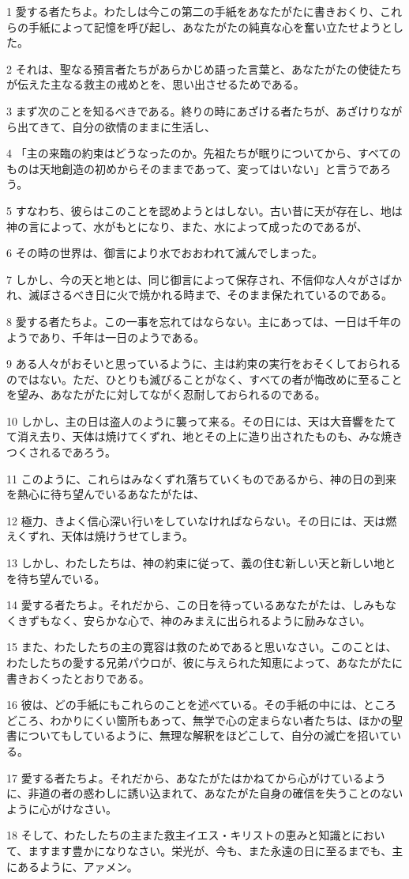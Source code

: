 \par 1 愛する者たちよ。わたしは今この第二の手紙をあなたがたに書きおくり、これらの手紙によって記憶を呼び起し、あなたがたの純真な心を奮い立たせようとした。
\par 2 それは、聖なる預言者たちがあらかじめ語った言葉と、あなたがたの使徒たちが伝えた主なる救主の戒めとを、思い出させるためである。
\par 3 まず次のことを知るべきである。終りの時にあざける者たちが、あざけりながら出てきて、自分の欲情のままに生活し、
\par 4 「主の来臨の約束はどうなったのか。先祖たちが眠りについてから、すべてのものは天地創造の初めからそのままであって、変ってはいない」と言うであろう。
\par 5 すなわち、彼らはこのことを認めようとはしない。古い昔に天が存在し、地は神の言によって、水がもとになり、また、水によって成ったのであるが、
\par 6 その時の世界は、御言により水でおおわれて滅んでしまった。
\par 7 しかし、今の天と地とは、同じ御言によって保存され、不信仰な人々がさばかれ、滅ぼさるべき日に火で焼かれる時まで、そのまま保たれているのである。
\par 8 愛する者たちよ。この一事を忘れてはならない。主にあっては、一日は千年のようであり、千年は一日のようである。
\par 9 ある人々がおそいと思っているように、主は約束の実行をおそくしておられるのではない。ただ、ひとりも滅びることがなく、すべての者が悔改めに至ることを望み、あなたがたに対してながく忍耐しておられるのである。
\par 10 しかし、主の日は盗人のように襲って来る。その日には、天は大音響をたてて消え去り、天体は焼けてくずれ、地とその上に造り出されたものも、みな焼きつくされるであろう。
\par 11 このように、これらはみなくずれ落ちていくものであるから、神の日の到来を熱心に待ち望んでいるあなたがたは、
\par 12 極力、きよく信心深い行いをしていなければならない。その日には、天は燃えくずれ、天体は焼けうせてしまう。
\par 13 しかし、わたしたちは、神の約束に従って、義の住む新しい天と新しい地とを待ち望んでいる。
\par 14 愛する者たちよ。それだから、この日を待っているあなたがたは、しみもなくきずもなく、安らかな心で、神のみまえに出られるように励みなさい。
\par 15 また、わたしたちの主の寛容は救のためであると思いなさい。このことは、わたしたちの愛する兄弟パウロが、彼に与えられた知恵によって、あなたがたに書きおくったとおりである。
\par 16 彼は、どの手紙にもこれらのことを述べている。その手紙の中には、ところどころ、わかりにくい箇所もあって、無学で心の定まらない者たちは、ほかの聖書についてもしているように、無理な解釈をほどこして、自分の滅亡を招いている。
\par 17 愛する者たちよ。それだから、あなたがたはかねてから心がけているように、非道の者の惑わしに誘い込まれて、あなたがた自身の確信を失うことのないように心がけなさい。
\par 18 そして、わたしたちの主また救主イエス・キリストの恵みと知識とにおいて、ますます豊かになりなさい。栄光が、今も、また永遠の日に至るまでも、主にあるように、アァメン。


